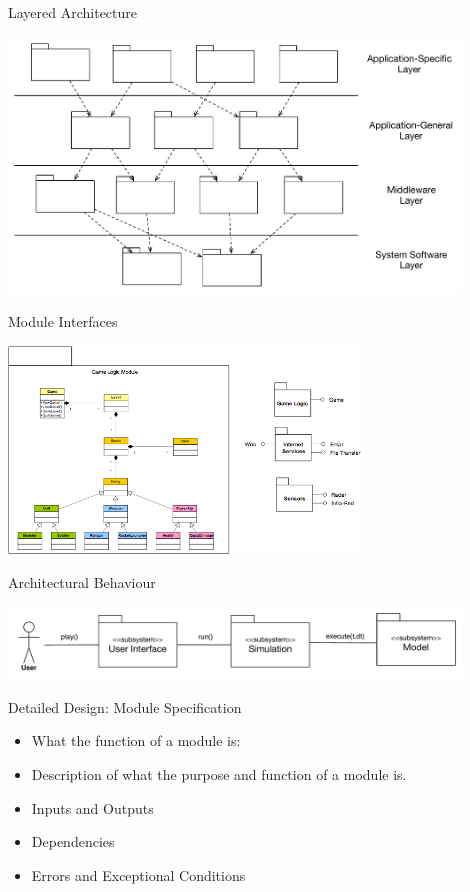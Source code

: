 \documentclass[aspectratio=1610,xcolor=dvipsnames,t,compress]{beamer}
\begin{document}
\begin{frame}{Layered Architecture}
    \begin{center}
        \includegraphics[width=0.9\textwidth]{layers} 
    \end{center}
\end{frame} 

\begin{frame}{Module Interfaces} 
    \begin{center}
        \includegraphics[width=0.7\textwidth]{module-interfaces} 
    \end{center}
\end{frame} 

\begin{frame}{Architectural Behaviour} 
    \begin{center}
        \includegraphics[width=0.9\textwidth]{behaviour} 
    \end{center} 
\end{frame} 

\begin{frame}{Detailed Design: Module Specification}
    \begin{itemize}
        \item What the function of a module is:
        \item Description of what the purpose and function of a module is.
        \item Inputs and Outputs
        \item Dependencies
        \item Errors and Exceptional Conditions
    \end{itemize} 
\end{frame} 
\end{document}
